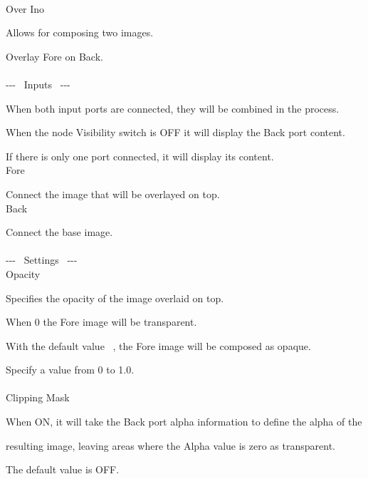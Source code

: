 \documentclass[a4paper,12pt]{article}
\begin{document}
\thispagestyle{empty}

\Large
\noindent \\
Over Ino\medskip
\par
\normalsize
Allows for composing two images.\par
Overlay Fore on Back.\\
\\
-{-}- \ Inputs \ -{-}-\par
When both input ports are connected, they will be combined in the process.\par
When the node Visibility switch is OFF it will display the Back port content.\par
If there is only one port connected, it will display its content.\\
Fore\par
Connect the image that will be overlayed on top.\\
Back\par
Connect the base image.\\
\\
-{-}- \ Settings \ -{-}-\\
Opacity\par
Specifies the opacity of the image overlaid on top.\par
When 0 the Fore image will be transparent.\par
With the default value \textquotedbl \ , the Fore image will be composed as opaque.\par
Specify a value from 0 to 1.0.\\
\\
Clipping Mask\par
When ON, it will take the Back port alpha information to define the alpha of the\par
resulting image, leaving areas where the Alpha value is zero as transparent.\par
The default value is OFF.
\end{document}
